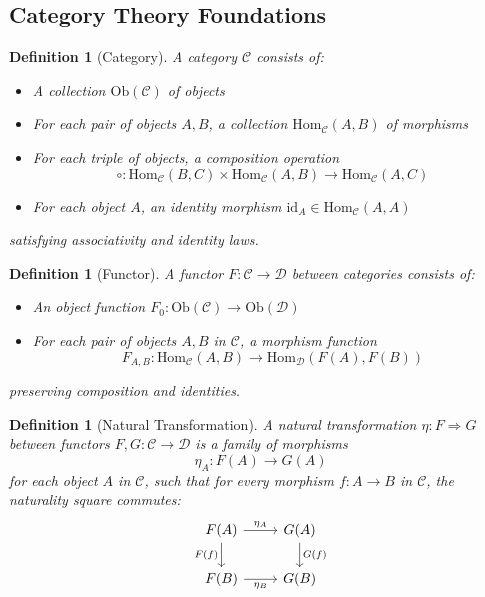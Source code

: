 \documentclass[11pt,a4paper]{article}
\newtheorem{definition}[theorem]{Definition}
\begin{document}
\subsection{Category Theory Foundations}

\begin{definition}[Category]
A category $\mathcal{C}$ consists of:
\begin{itemize}
    \item A collection $\text{Ob}(\mathcal{C})$ of objects
    \item For each pair of objects $A, B$, a collection $\text{Hom}_{\mathcal{C}}(A, B)$ of morphisms
    \item For each triple of objects, a composition operation
    \[
    \circ: \text{Hom}_{\mathcal{C}}(B, C) \times \text{Hom}_{\mathcal{C}}(A, B) \rightarrow \text{Hom}_{\mathcal{C}}(A, C)
    \]
    \item For each object $A$, an identity morphism $\text{id}_A \in \text{Hom}_{\mathcal{C}}(A, A)$
\end{itemize}
satisfying associativity and identity laws.
\end{definition}

\begin{definition}[Functor]
A functor $F: \mathcal{C} \rightarrow \mathcal{D}$ between categories consists of:
\begin{itemize}
    \item An object function $F_0: \text{Ob}(\mathcal{C}) \rightarrow \text{Ob}(\mathcal{D})$
    \item For each pair of objects $A, B$ in $\mathcal{C}$, a morphism function
    \[
    F_{A,B}: \text{Hom}_{\mathcal{C}}(A, B) \rightarrow \text{Hom}_{\mathcal{D}}(F(A), F(B))
    \]
\end{itemize}
preserving composition and identities.
\end{definition}

\begin{definition}[Natural Transformation]
A natural transformation $\eta: F \Rightarrow G$ between functors $F, G: \mathcal{C} \rightarrow \mathcal{D}$ is a family of morphisms
\[
\eta_A: F(A) \rightarrow G(A)
\]
for each object $A$ in $\mathcal{C}$, such that for every morphism $f: A \rightarrow B$ in $\mathcal{C}$, the naturality square commutes:
\[
\begin{tikzcd}
F(A) \arrow[r, "\eta_A"] \arrow[d, "F(f)"'] & G(A) \arrow[d, "G(f)"] \\
F(B) \arrow[r, "\eta_B"'] & G(B)
\end{tikzcd}
\]
\end{definition}
\end{document}
